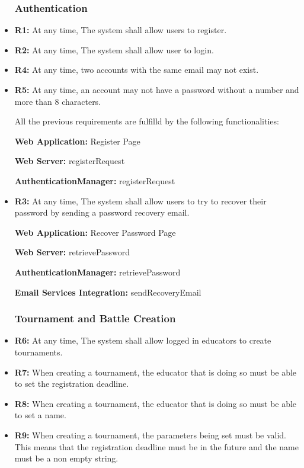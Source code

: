 \documentclass{article}
\begin{document}
\begin{itemize}

    \subsubsection*{Authentication}

    \item \textbf{R1:} At any time, The system shall allow users to register.
    \item \textbf{R2:} At any time, The system shall allow user to login. 
    \item \textbf{R4:} At any time, two accounts with the same email may not exist.
    \item \textbf{R5:} At any time, an account may not have a password without a number and more than 8 characters.
    
    All the previous requirements are fulfilld by the following functionalities:

    \textbf{Web Application:} Register Page

    \textbf{Web Server:} registerRequest

    \textbf{AuthenticationManager:} registerRequest

    \item \textbf{R3:} At any time, The system shall allow users to try to recover their password by sending a password recovery email.

    \textbf{Web Application:} Recover Password Page

    \textbf{Web Server:} retrievePassword

    \textbf{AuthenticationManager:} retrievePassword

    \textbf{Email Services Integration:} sendRecoveryEmail

    \subsubsection*{Tournament and Battle Creation}

    \item \textbf{R6:} At any time, The system shall allow logged in educators to create tournaments.
    \item \textbf{R7:} When creating a tournament, the educator that is doing so must be able to set the registration deadline.
    \item \textbf{R8:} When creating a tournament, the educator that is doing so must be able to set a name.
    \item \textbf{R9:} When creating a tournament, the parameters being set must be valid. This means that the registration deadline must be in the future and the name must be a non empty string.
    

\end{itemize}
\end{document}
